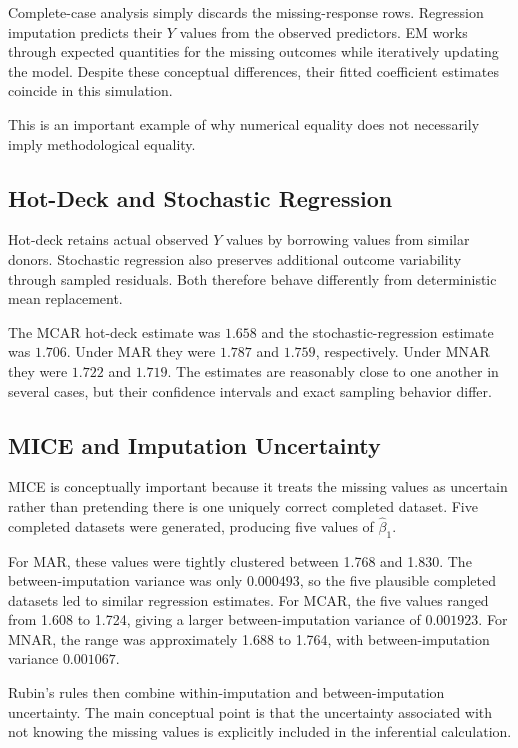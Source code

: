\documentclass[11pt,a4paper]{article}
\begin{document}
Complete-case analysis simply discards the missing-response rows. Regression imputation predicts their $Y$ values from the observed predictors. EM works through expected quantities for the missing outcomes while iteratively updating the model. Despite these conceptual differences, their fitted coefficient estimates coincide in this simulation.

This is an important example of why numerical equality does not necessarily imply methodological equality.

\subsection{Hot-Deck and Stochastic Regression}
Hot-deck retains actual observed $Y$ values by borrowing values from similar donors. Stochastic regression also preserves additional outcome variability through sampled residuals. Both therefore behave differently from deterministic mean replacement.

The MCAR hot-deck estimate was $1.658$ and the stochastic-regression estimate was $1.706$. Under MAR they were $1.787$ and $1.759$, respectively. Under MNAR they were $1.722$ and $1.719$. The estimates are reasonably close to one another in several cases, but their confidence intervals and exact sampling behavior differ.

\subsection{MICE and Imputation Uncertainty}
MICE is conceptually important because it treats the missing values as uncertain rather than pretending there is one uniquely correct completed dataset. Five completed datasets were generated, producing five values of $\hat\beta_1$.

For MAR, these values were tightly clustered between 1.768 and 1.830. The between-imputation variance was only $0.000493$, so the five plausible completed datasets led to similar regression estimates. For MCAR, the five values ranged from 1.608 to 1.724, giving a larger between-imputation variance of $0.001923$. For MNAR, the range was approximately 1.688 to 1.764, with between-imputation variance $0.001067$.

Rubin's rules then combine within-imputation and between-imputation uncertainty. The main conceptual point is that the uncertainty associated with not knowing the missing values is explicitly included in the inferential calculation.
\end{document}
